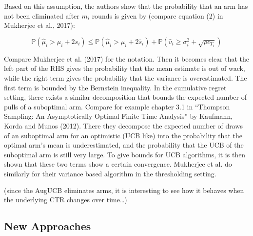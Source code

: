 \documentclass[12pt,]{article}
\begin{document}
Based on this assumption, the authors show that the probability that an
arm has not been eliminated after \(m_i\) rounds is given by (compare
equation (2) in Mukherjee et al., 2017):

\begin{equation} \label{Mukherjee2017Equation2}
\mathbb{P}(\hat{\mu}_i > \mu_i + 2s_i) \leq \mathbb{P} (\hat{\mu}_i > \mu_i + 2\bar{s}_i) + \mathbb{P}(\hat{v}_i \geq \sigma^2_i + \sqrt{\rho \epsilon_{T_i}})
\end{equation}

Compare Mukherjee et al. (2017) for the notation. Then it becomes clear
that the left part of the RHS gives the probability that the mean
estimate is out of wack, while the right term gives the probability that
the variance is overestimated. The first term is bounded by the
Bernstein inequality. In the cumulative regret setting, there exists a
similar decomposition that bounds the expected number of pulls of a
suboptimal arm. Compare for example chapter 3.1 in ``Thompson Sampling:
An Asymptotically Optimal Finite Time Analysis'' by Kaufmann, Korda and
Munos (2012). There they decompose the expected number of draws of an
suboptimal arm for an optimistic (UCB like) into the probability that
the optimal arm's mean is underestimated, and the probability that the
UCB of the suboptimal arm is still very large. To give bounds for UCB
algorithms, it is then shown that these two terms show a certain
convergence. Mukherjee et al. do similarly for their variance based
algorithm in the thresholding setting.

(since the AugUCB eliminates arms, it is interesting to see how it
behaves when the underlying CTR changes over time\ldots{})

\subsection{New Approaches}\label{new-approaches}
\end{document}
